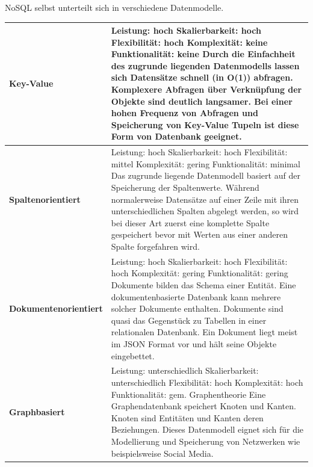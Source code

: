 \newpage
NoSQL selbst unterteilt sich in verschiedene Datenmodelle. \cite{WikiNoSQL}
\begin{longtable}{| p{4cm} | p{11.7cm} |}
\hline
\textbf{Key-Value} & Leistung: hoch \newline Skalierbarkeit: hoch \newline Flexibilität: hoch \newline Komplexität: keine \newline Funktionalität: keine \newline
Durch die Einfachheit des zugrunde liegenden Datenmodells lassen sich Datensätze schnell (in O(1)) abfragen. Komplexere Abfragen über Verknüpfung der Objekte sind deutlich langsamer. Bei einer hohen Frequenz von Abfragen und Speicherung von Key-Value Tupeln ist diese Form von Datenbank geeignet.
\\ \hline
\textbf{Spaltenorientiert} & Leistung: hoch \newline Skalierbarkeit: hoch \newline Flexibilität: mittel \newline Komplexität: gering \newline Funktionalität: minimal \newline
Das zugrunde liegende Datenmodell basiert auf der Speicherung der Spaltenwerte. Während normalerweise Datensätze auf einer Zeile mit ihren unterschiedlichen Spalten abgelegt werden, so wird bei dieser Art zuerst eine komplette Spalte gespeichert bevor mit Werten aus einer anderen Spalte forgefahren wird. 
\\ \hline
\textbf{Dokumentenorientiert} & Leistung: hoch \newline Skalierbarkeit: hoch \newline Flexibilität: hoch \newline Komplexität: gering \newline Funktionalität: gering \newline
Dokumente bilden das Schema einer Entität. Eine dokumentenbasierte Datenbank kann mehrere solcher Dokumente enthalten. Dokumente sind quasi das Gegenstück zu Tabellen in einer relationalen Datenbank. Ein Dokument liegt meist im JSON Format vor und hält seine Objekte eingebettet. 
\\ \hline
\textbf{Graphbasiert} & Leistung: unterschiedlich \newline Skalierbarkeit: unterschiedlich \newline Flexibilität: hoch \newline Komplexität: hoch \newline Funktionalität: gem. Graphentheorie \newline
Eine Graphendatenbank speichert Knoten und Kanten. Knoten sind Entitäten und Kanten deren Beziehungen. Dieses Datenmodell eignet sich für die Modellierung und Speicherung von Netzwerken wie beispielsweise Social Media.
\\ \hline
\end{longtable}

